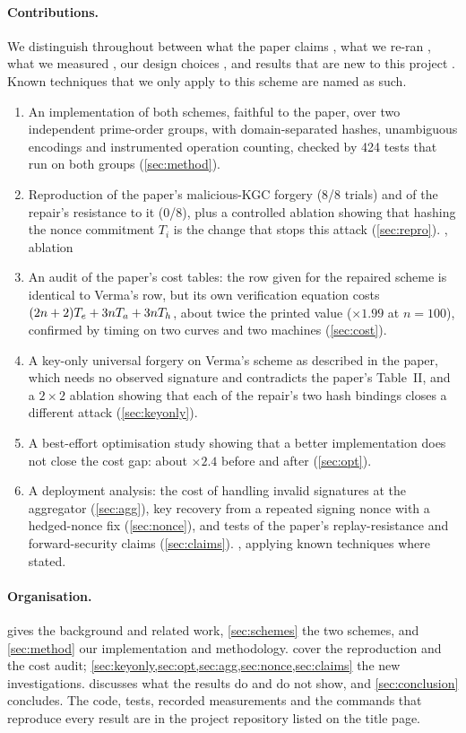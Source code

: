 \paragraph{Contributions.}
We distinguish throughout between what the paper claims , what we re-ran ,
what we measured , our design choices , and results that are new to
this project . Known techniques that we only apply to this scheme are named as such.
\begin{enumerate}
\item An implementation of both schemes, faithful to the paper, over two independent prime-order
      groups, with domain-separated hashes, unambiguous encodings and instrumented operation counting, checked by 424
      tests that run on both groups (\cref{sec:method}). 
\item Reproduction of the paper's malicious-KGC forgery (8/8 trials) and of the repair's resistance to it
      (0/8), plus a controlled ablation showing that hashing the nonce commitment $T_i$ is the change that
      stops this attack (\cref{sec:repro}). , ablation 
\item An audit of the paper's cost tables: the row given for the repaired scheme is identical to Verma's
      row, but its own verification equation costs $(2n+2)T_{e}+3nT_{a}+3nT_{h}$, about twice the printed value
      ($\times1.99$ at $n=100$), confirmed by timing on two curves and two machines (\cref{sec:cost}).
\item A key-only universal forgery on Verma's scheme as described in the paper, which needs no observed
      signature and contradicts the paper's Table~II, and a $2\times2$ ablation showing that each of the
      repair's two hash bindings closes a different attack (\cref{sec:keyonly}). 
\item A best-effort optimisation study showing that a better implementation does not close the cost gap:
      about $\times2.4$ before and after (\cref{sec:opt}). 
\item A deployment analysis: the cost of handling invalid signatures at the aggregator
      (\cref{sec:agg}), key recovery from a repeated signing nonce with a hedged-nonce fix
      (\cref{sec:nonce}), and tests of the paper's replay-resistance and forward-security claims
      (\cref{sec:claims}). , applying known techniques where stated.
\end{enumerate}

\paragraph{Organisation.}
 gives the background and related work, \cref{sec:schemes} the two schemes, and
\cref{sec:method} our implementation and methodology.  cover the reproduction and
the cost audit; \cref{sec:keyonly,sec:opt,sec:agg,sec:nonce,sec:claims} the new investigations.
 discusses what the results do and do not show, and \cref{sec:conclusion}
concludes. The code, tests, recorded measurements and the commands that reproduce every result are in
the project repository listed on the title page.
